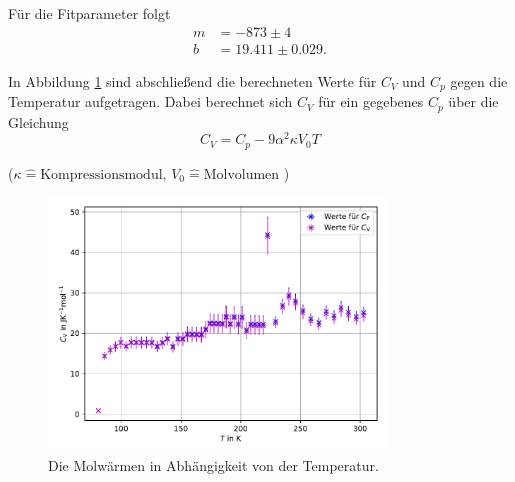 Für die Fitparameter folgt
\begin{align}
    m &=  -873 \pm 4 \\
    b &=  19.411 \pm 0.029 .
\end{align}

In Abbildung \ref{fig:cvcp} sind abschließend die berechneten Werte für $C_V$ und $C_p$ gegen die Temperatur aufgetragen. Dabei berechnet sich $C_V$ für ein gegebenes $C_p$ über die Gleichung
\begin{equation}
    C_V = C_p - 9 \alpha^2 \kappa V_0 T
\end{equation}
\begin{center}
    \tiny{($\kappa \hat{=} \text{Kompressionsmodul} $, $V_0 \hat{=} \text{Molvolumen} $ )}
\end{center}
\begin{figure}[H]
    \centering
    \includegraphics[width=0.8\textwidth]{data/plots/plot_Cv.pdf}
    \caption{Die Molwärmen in Abhängigkeit von der Temperatur.}
    \label{fig:cvcp}
\end{figure}

